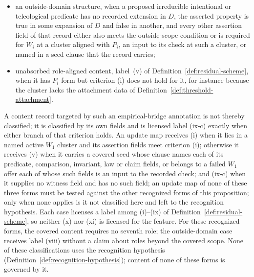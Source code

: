 \begin{proposition}
\begin{itemize}[topsep=2pt,itemsep=1pt]
  \item an outside-domain structure, when a proposed irreducible intentional
    or teleological predicate has no recorded extension in \(D\), the asserted property is true in some expansion of \(D\) and false in another, and every other assertion field of that record either also meets the outside-scope condition or is required for \(W_i\) at a cluster aligned with \(P_i\), an input to its check at such a cluster, or named in a seed clause that the record carries;
  \item unabsorbed role-aligned content, label~(v) of
    Definition~\ref{def:residual-scheme}, when it has \(P_i\)-form but
    criterion (i) does not hold for it, for instance because the cluster lacks
    the attachment data of Definition~\ref{def:threshold-attachment}.
\end{itemize}
A content record targeted by such an empirical-bridge annotation is not thereby classified; it is classified by its own fields and is licensed label (ix-c) exactly when either branch of that criterion holds.
An update map receives (i) when it lies in a named active \(W_1\) cluster and
its assertion fields meet criterion (i); otherwise it receives (v) when it
carries a covered \Pone{} seed whose clause names each of its predicate,
comparison, invariant, law or claim fields, or belongs to a failed \(W_1\)
offer each of whose such fields is an input to the recorded check; and (ix-c)
when it supplies no witness field and has no such field; an update map of none of these three forms must be tested against the other recognized forms of this proposition; only when none applies is it not classified here and left to the recognition hypothesis. Each case licenses a label among (i)--(ix) of
Definition~\ref{def:residual-scheme}, so neither (x) nor (xi) is licensed for
the feature. For these recognized forms, the
covered content requires no seventh role; the outside-domain case receives
label (viii) without a claim about roles beyond the covered scope. None of
these classifications uses the recognition hypothesis
(Definition~\ref{def:recognition-hypothesis}); content of none of these forms
is governed by it.
\end{proposition}

